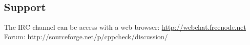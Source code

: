\subsection{Support}
The IRC channel can be access with a web browser: \url{http://webchat.freenode.net}
Forum: \url{http://sourceforge.net/p/cppcheck/discussion/}






%
%
%
%